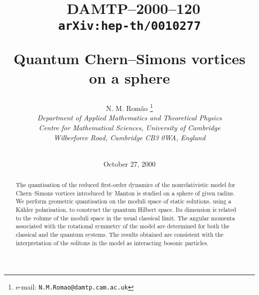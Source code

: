 \documentclass[a4paper,11pt]{article}
\begin{document}
 

\begin{titlepage}

\vspace{2cm}

\title
{\vskip -70pt
\begin{flushright}
{\normalsize \ DAMTP--2000--120\\[-2mm]{\tt arXiv:hep-th/0010277}}\\
\end{flushright}
\vskip 2cm
{\bf Quantum Chern--Simons vortices on a sphere}
\vspace{1.5cm}
}


\author{
{\Large \sc N. M. Rom\~ao}
\thanks{e-mail: {\tt N.M.Romao@damtp.cam.ac.uk}}\\[7mm]
{\normalsize \sl Department of Applied Mathematics and Theoretical Physics}\\
{\normalsize \sl Centre for Mathematical Sciences, University of Cambridge} \\
{\normalsize \sl Wilberforce Road, Cambridge CB3 0WA, England}\\
\\}

\date{October 27, 2000}

\maketitle
\thispagestyle{empty}
\vspace{1cm}

\begin{abstract}

\noindent
The quantisation of the reduced first-order dynamics of the 
nonrelativistic model 
for Chern--Simons vortices introduced by Manton is studied on a sphere
of given radius.
We perform geometric quantisation on the moduli space of static solutions,
using a K\"ahler polarisation, to construct the quantum 
Hilbert space. Its dimension
is related to the volume of the moduli space in the usual classical 
limit.
The angular momenta associated with the rotational \coordHE{} symmetry of 
the model are determined for both the classical and the quantum
systems. The results obtained are consistent with the interpretation 
of the solitons in the model as interacting bosonic particles.


\end{abstract}

\end{titlepage}
\end{document}
